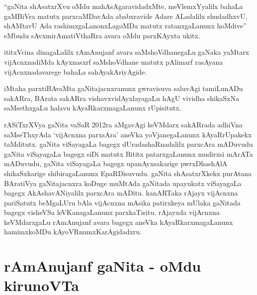 ``gaNita shAsatxrXvu oMdu mahAsAgaravidadxMte, meVlemxYyalilx bahaLa gaMBiVra matutx parxcaMDavAda ababxravide Adare ALadalilx  shudadhxvU, shAMtavU Ada rashimxgaLanonxLagoMDa matutx ratanxgaLanunx hoMdive'' eMbudu sAvxmirAmatiVthaRra avara oMdu parxKAyxta ukitx.

ititxVcina dinagaLalilx rAmAnujanf avara saMshoVdhanegaLu gaNaka yaMtarx vijAcnxna\-diMda kAyxnasxrf saMshoVdhane matutx pAlimarf rasAyana vijAcnxnadavarege bahaLa sahAya\-kAriyAgide.

iMtaha parxtiBAvaMta gaNitajacnxranunx gwravisuva saluvAgi tamiLunADu sakARra, BArata sakARra vishavxvidAyxlayagaLu hAgU vividha shikaSxNa saMsethxgaLu halavu kAyaRkarxma\-gaLanunx rUpisitutx.

rASiTxrXVya gaNita vaSaR {\rm 2012}ra aMgavAgi keVMdarx sakARrada adhiVna saMseThxyAda `vijAcnxna parxsAra' aneVka yoVjanegaLanunx kAyaRrUpakekx taMditutx. gaNita viSayagaLa bagegx dUradashaRnadalilx parxcAra mADuvudu gaNita viSayagaLa bagegx siDi matutx Bititx patarxgaLanunx mudirxsi mArATa mADuvudu, gaNita viSayagaLa bagegx upanAyxsakarige pwrxDhashAlA shikaSxkarige shibiragaLanunx EpaRDisuvudu. gaNita shAsatxrXkekx purAtana BAratiVya gaNitajacnxra koDuge muMtAda gaNitada upayukatx viSayagaLa bagegx AkAshavANiyalilx parxcAra mADitu. kanARTaka rAjayx vijAcnxna pariSatutx beMgaLUru bAla vijAcnxna mAsika patirxkeya mUlaka gaNitada bagegx visheVSa leVKanagaLanunx parxkaTisitu. rAjayxda vijAcnxna keVMdarxgaLu rAmAnujanf avara bagegx aneVka kAyaRkarxmagaLanunx hamimxkoMDu kAyoVRnumxKarAgidadxru.

\section*{rAmAnujanf gaNita - oMdu kirunoVTa}

